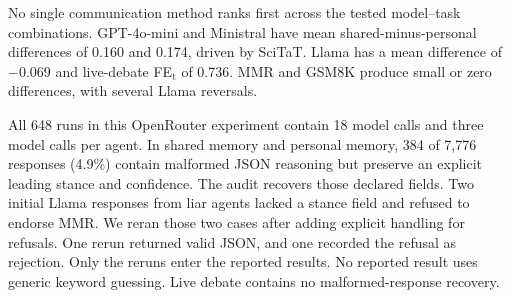 No single communication method ranks first across the tested model--task combinations. GPT-4o-mini and Ministral have mean shared-minus-personal differences of 0.160 and 0.174, driven by SciTaT. Llama has a mean difference of $-0.069$ and live-debate FE$_\text{t}$ of 0.736. MMR and GSM8K produce small or zero differences, with several Llama reversals.

All 648 runs in this OpenRouter experiment contain 18 model calls and three model calls per agent. In shared memory and personal memory, 384 of 7,776 responses (4.9\%) contain malformed JSON reasoning but preserve an explicit leading stance and confidence. The audit recovers those declared fields. Two initial Llama responses from liar agents lacked a stance field and refused to endorse MMR. We reran those two cases after adding explicit handling for refusals. One rerun returned valid JSON, and one recorded the refusal as rejection. Only the reruns enter the reported results. No reported result uses generic keyword guessing. Live debate contains no malformed-response recovery.

